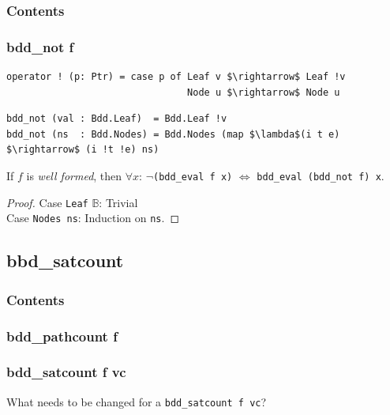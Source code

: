 \documentclass[english, aspectratio=169]{beamer}
\newcommand{\B}[0]{\ensuremath{\mathbb{B}}}
\begin{document}
\begin{frame}{}
  \frametitle{Contents}
\end{frame}

\begin{frame}[fragile]
  \frametitle{bdd\_not f}

  \begin{lstlisting}
operator ! (p: Ptr) = case p of Leaf v $\rightarrow$ Leaf !v
                                Node u $\rightarrow$ Node u
  \end{lstlisting}
  \begin{lstlisting}[firstnumber=4]
bdd_not (val : Bdd.Leaf)  = Bdd.Leaf !v
bdd_not (ns  : Bdd.Nodes) = Bdd.Nodes (map $\lambda$(i t e) $\rightarrow$ (i !t !e) ns)
  \end{lstlisting}

  \pause

  \begin{theorem}
    If $f$ is \emph{well formed}, then $\forall x$: $\neg$\texttt{(bdd\_eval f x)} $\iff$
    \texttt{bdd\_eval (bdd\_not f) x}.
  \end{theorem}
  \begin{proof}
    Case \texttt{Leaf} $\B$: Trivial\\
    Case \texttt{Nodes ns}: Induction on \texttt{ns}.
  \end{proof}
\end{frame}

\subsection{bbd\_satcount}

\begin{frame}{}
  \frametitle{Contents}
\end{frame}

\begin{frame}
  \frametitle{bdd\_pathcount f}

  
\end{frame}

\begin{frame}{}
  \frametitle{bdd\_satcount f vc}

  \begin{center}
    \Huge

    What needs to be changed for a \texttt{bdd\_satcount f vc}?
  \end{center}
\end{frame}
\end{document}
